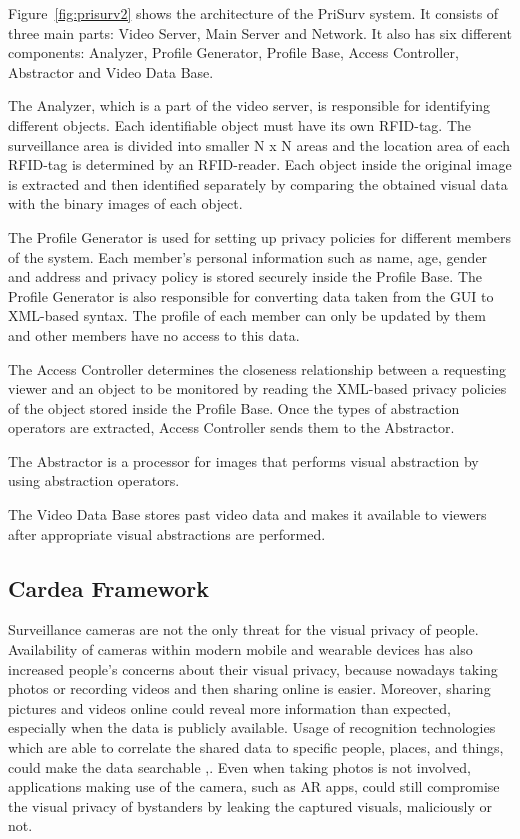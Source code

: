 \documentclass[conference]{IEEEtran}
\begin{document}
Figure~\ref{fig:prisurv2} shows the architecture of the PriSurv system. It consists of three main parts: Video Server, Main Server and Network. It also has six different components: Analyzer, Profile Generator, Profile Base, Access Controller, Abstractor and Video Data Base. 

The Analyzer, which is a part of the video server, is responsible for identifying different objects. Each identifiable object must have its own \ac{RFID}-tag. The surveillance area is divided into smaller N x N areas and the location area of each \ac{RFID}-tag is determined by an \ac{RFID}-reader. Each object inside the original image is extracted and then identified separately by comparing the obtained visual data with the binary images of each object. 

The Profile Generator is used for setting up privacy policies for different members of the system. Each member's personal information such as name, age, gender and address and privacy policy is stored securely inside the Profile Base. The Profile Generator is also responsible for converting data taken from the GUI to \ac{XML}-based syntax. The profile of each member can only be updated by them and other members have no access to this data. 

The Access Controller determines the closeness relationship between a requesting viewer and an object to be monitored by reading the \ac{XML}-based privacy policies of the object stored inside the Profile Base. Once the types of abstraction operators are extracted, Access Controller sends them to the Abstractor. 

The Abstractor is a processor for images that performs visual abstraction by using abstraction operators. 

The Video Data Base stores past video data and makes it available to viewers after appropriate visual abstractions are performed. 

\subsection{Cardea Framework}

Surveillance cameras are not the only threat for the visual privacy of people. Availability of cameras within modern mobile and wearable devices has also increased people's concerns about their visual privacy, because nowadays taking photos or recording videos and then sharing online is easier. Moreover, sharing pictures and videos online could reveal more information than expected, especially when the data is publicly available. Usage of recognition technologies which are able to correlate the shared data to specific people, places, and things, could make the data searchable \cite{gross2014},\cite{shaw2006}. Even when taking photos is not involved, applications making use of the camera, such as \ac{AR} apps, could still compromise the visual privacy of bystanders by leaking the captured visuals, maliciously or not. 
\end{document}
